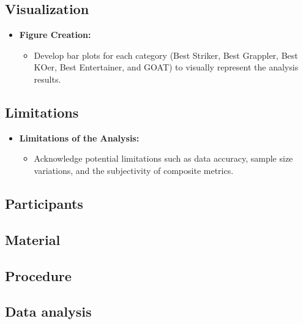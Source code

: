 \documentclass[
  man,floatsintext]{apa6}
\providecommand{\tightlist}{%
  \setlength{\itemsep}{0pt}\setlength{\parskip}{0pt}}
\begin{document}
\hypertarget{visualization}{%
\subsection{Visualization}\label{visualization}}

\begin{itemize}
\tightlist
\item
  \textbf{Figure Creation:}

  \begin{itemize}
  \tightlist
  \item
    Develop bar plots for each category (Best Striker, Best Grappler, Best KOer, Best Entertainer, and GOAT) to visually represent the analysis results.
  \end{itemize}
\end{itemize}

\hypertarget{limitations}{%
\subsection{Limitations}\label{limitations}}

\begin{itemize}
\tightlist
\item
  \textbf{Limitations of the Analysis:}

  \begin{itemize}
  \tightlist
  \item
    Acknowledge potential limitations such as data accuracy, sample size variations, and the subjectivity of composite metrics.
  \end{itemize}
\end{itemize}

\hypertarget{participants}{%
\subsection{Participants}\label{participants}}

\hypertarget{material}{%
\subsection{Material}\label{material}}

\hypertarget{procedure}{%
\subsection{Procedure}\label{procedure}}

\hypertarget{data-analysis}{%
\subsection{Data analysis}\label{data-analysis}}
\end{document}
